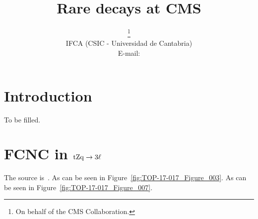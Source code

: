 \documentclass{PoS}
\title{Rare decays at CMS}
\author{\speaker{J\'onatan Piedra}\thanks{On behalf of the CMS Collaboration.}\\
        IFCA (CSIC - Universidad de Cantabria)\\
        E-mail: \email{piedra@cern.ch}}
\begin{document}
\section{Introduction}

To be filled.


\section{FCNC in ${\rm tZq \to 3\ell}$}

The source is~\cite{top-17-017}.
As can be seen in Figure~\ref{fig:TOP-17-017_Figure_003}.
As can be seen in Figure~\ref{fig:TOP-17-017_Figure_007}.
\end{document}
